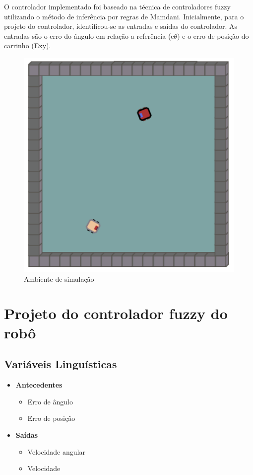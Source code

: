 O controlador implementado foi baseado na técnica de controladores fuzzy utilizando
o método de inferência por regras de Mamdani. 
Inicialmente, para o projeto do controlador, identificou-se as entradas e saídas do controlador. As entradas são o erro do ângulo em relação a referência (e$\theta$) e o erro de posição do carrinho (Exy). 

\begin{figure}[H] 
    \centering
    \includegraphics[scale=0.5]{carrinho_base.png}
    \caption{Ambiente de simulação}
\end{figure}

\section{Projeto do controlador fuzzy do robô}
    \subsection{Variáveis Linguísticas}
        \begin{itemize}
            \item{\bf{Antecedentes}}
                \begin{itemize}
                    \item Erro de ângulo
                    \item Erro de posição
                \end{itemize}
            \item{\bf{Saídas}}
                \begin{itemize}
                        \item Velocidade angular
                        \item Velocidade
                \end{itemize}
        \end{itemize}
